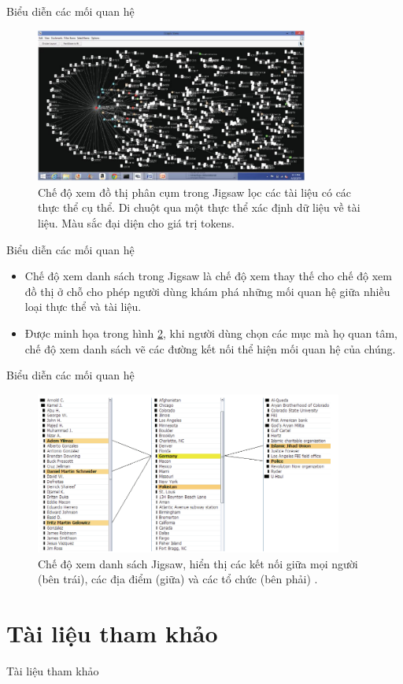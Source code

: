 \documentclass[10pt]{beamer}
\theoremstyle{remark}
\theoremstyle{definition}
\begin{document}
\begin{frame}{Biểu diễn các mối quan hệ}
	\begin{figure}[h!]
        \centering
        \includegraphics[width=0.8\textwidth]{19.png}
        \caption{Chế độ xem đồ thị phân cụm trong Jigsaw lọc các tài liệu có các thực thể cụ thể.
        Di chuột qua một thực thể xác định dữ liệu về tài liệu.
        Màu sắc đại diện cho giá trị tokens.}
        \label{fig:19}
    \end{figure}
\end{frame}

\begin{frame}{Biểu diễn các mối quan hệ}
	\begin{itemize}
		\item Chế độ xem danh sách trong Jigsaw là chế độ xem thay thế cho chế độ xem đồ thị ở chỗ cho phép người dùng khám phá những mối quan hệ giữa nhiều loại thực thể và tài liệu.
		\item Được minh họa trong hình \ref{fig:20}, khi người dùng chọn các mục mà họ quan tâm, chế độ xem danh sách vẽ các đường kết nối thể hiện mối quan hệ của chúng.
	\end{itemize}
\end{frame}

\begin{frame}{Biểu diễn các mối quan hệ}
	\begin{figure}[h!]
        \centering
        \includegraphics[width=0.9\textwidth]{20.png}
        \caption{Chế độ xem danh sách Jigsaw, hiển thị các kết nối giữa mọi người (bên trái), các địa điểm (giữa) và các tổ chức (bên phải) \cite{155}.}
        \label{fig:20}
    \end{figure}
\end{frame}

\section{Tài liệu tham khảo}
\begin{frame}[allowframebreaks]{Tài liệu tham khảo}
    \printbibliography
\end{frame}
\end{document}
